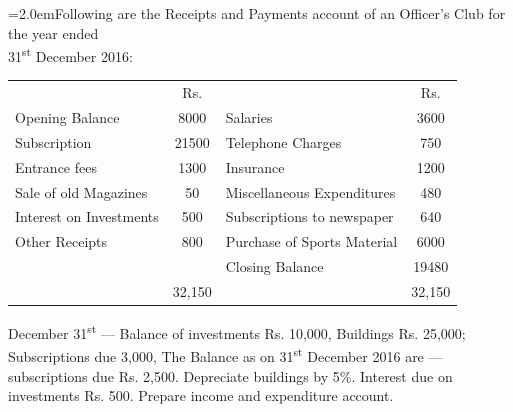 \documentclass[11pt,a4paper]{article}
\newcommand{\lqn}[2]{\Needspace{6\baselineskip}\par\medskip\noindent\hangindent=2.0em\hangafter=1\makebox[2.0em][l]{\textbf{#1.}}#2\par}
\begin{document}
\lqn{20}{Following are the Receipts and Payments account of an Officer’s Club for the year ended\\
31\textsuperscript{st} December 2016:\par
\par\smallskip\noindent\hspace*{1.2em}\begin{tabular}{|lclc|}
\hline
 & Rs. &  & Rs. \\
Opening Balance & 8000 & Salaries & 3600 \\
Subscription & 21500 & Telephone Charges & 750 \\
Entrance fees & 1300 & Insurance & 1200 \\
Sale of old Magazines & 50 & Miscellaneous Expenditures & 480 \\
Interest on Investments & 500 & Subscriptions to newspaper & 640 \\
Other Receipts & 800 & Purchase of Sports Material & 6000 \\
 &  & Closing Balance & 19480 \\
 & 32,150 &  & 32,150 \\
\hline
\end{tabular}\par\smallskip
2015 December 31\textsuperscript{st}  --- Balance of investments Rs. 10,000, Buildings Rs. 25,000; Subscriptions due 3,000, The Balance as on 31\textsuperscript{st}  December 2016 are --- subscriptions due Rs. 2,500. Depreciate buildings by 5\%. Interest due on investments Rs. 500. Prepare income and expenditure account.\par
}
\end{document}
